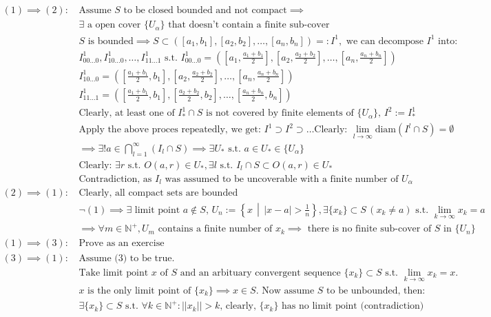 \documentclass{article}
\newcommand{\N}{\mathbb{N}}
\newcommand{\st}{\mbox{ s.t. }}
\newcommand{\clear}{\mbox{Clearly: }}
\newcommand{\diam}{\mbox{diam}}
\newcommand{\0}{{\bf{0}}}
\begin{document}
\begin{equation}
\begin{split}
    (1)\implies(2):\,&\mbox{Assume }S\mbox{ to be closed bounded and not compact}\implies\\
    &\exists\mbox{ a open cover }\{U_\alpha\}\mbox{ that doesn't contain a finite sub-cover}\\
    &S\mbox{ is bounded}\implies S\subset([a_1,b_1],[a_2,b_2],\dots,[a_n,b_n])=:I^1,\mbox{ we can decompose }I^1\mbox{ into:}\\
    &I_{00\dots0}^1,I_{10\dots0}^1,\dots,I_{11\dots1}^1\st I_{00\dots0}^1=\left(\left[a_1,\frac{a_1+b_1}{2}\right],\left[a_2,\frac{a_2+b_2}{2}\right],\dots,\left[a_n,\frac{a_n+b_n}{2}\right]\right)\\
    &I_{10\dots0}^1=\left(\left[\frac{a_1+b_1}{2},b_1\right],\left[a_2,\frac{a_2+b_2}{2}\right],\dots,\left[a_n,\frac{a_n+b_n}{2}\right]\right)\\
    &I_{11\dots1}^1=\left(\left[\frac{a_1+b_1}{2},b_1\right],\left[\frac{a_2+b_2}{2},b_2\right],\dots,\left[\frac{a_n+b_n}{2},b_n\right]\right)\\
    &\mbox{Clearly, at least one of }I_*^1\cap S\mbox{ is not covered by finite elements of }\{U_\alpha\},\, I^2:=I_*^1\\
    &\mbox{Apply the above proces repeatedly, we get: }I^1\supset I^2\supset\dots\clear\lim_{l\to\infty}\diam(I^l\cap S)=\emptyset\\
    &\implies\exists! a\in\bigcap_{l=1}^\infty(I_l\cap S)\implies\exists U_*\st a\in U_*\in\{U_\alpha\}\\
    &\clear\exists r\st O(a,r)\in U_*,\exists l\st I_l\cap S\subset O(a,r)\in U_*\\
    &\mbox{Contradiction, as }I_l\mbox{ was assumed to be uncoverable with a finite number of }U_\alpha\\
    (2)\implies(1):\,&\mbox{Clearly, all compact sets are bounded}\\
    &\neg(1)\implies\exists\mbox{ limit point }a\notin S,\,U_n:=\left\{x\,\middle\vert\,|x-a|>\frac{1}{n}\right\},\exists\{x_k\}\subset S\,(x_k\neq a)\st\lim_{k\to\infty}x_k=a\\
    &\implies\forall m\in\N^+,U_m\mbox{ contains a finite number of }x_k\implies\mbox{ there is no finite sub-cover of }S\mbox{ in }\{U_n\}\\
    (1)\implies(3):\,&\mbox{Prove as an exercise}\\
    (3)\implies(1):\,&\mbox{Assume (3) to be true.}\\
    &\mbox{Take limit point }x\mbox{ of }S\mbox{ and an arbituary convergent sequence }\{x_k\}\subset S\st\lim_{k\to\infty}x_k=x.\\
    &x\mbox{ is the only limit point of }\{x_k\}\implies x\in S.\mbox{ Now assume }S\mbox{ to be unbounded, then: }\\
    &\exists\{x_k\}\subset S\st\forall k\in\N^+:||x_k||>k\mbox{, clearly, }\{x_k\}\mbox{ has no limit point (contradiction)}
\end{split}
\end{equation}
\end{document}
